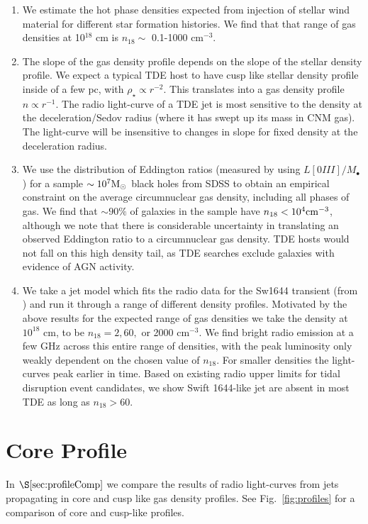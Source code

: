 \documentclass[usenatbib,fleqn]{mnras}
\newcommand{\Mbh}[1][]{M_{\bullet#1}}
\newcommand{\Msun}{{\rm M_\odot}}
\begin{document}
\begin{enumerate}
\item We estimate the hot phase densities expected from injection of
  stellar wind material for different star formation histories. We
  find that that range of gas densities at 10$^{18}$ cm is $n_{18}
  \sim$ 0.1-1000 cm$^{-3}$.

\item The slope of the gas density profile depends on the slope of the
  stellar density profile. We expect a typical TDE host to have cusp
  like stellar density profile inside of a few pc, with $\rho_\star
  \propto r^{-2}$. This translates into a gas density profile $n
  \propto r^{-1}$. The radio light-curve of a TDE jet is most
  sensitive to the density at the deceleration/Sedov radius (where it
  has swept up its mass in CNM gas). The light-curve will be
  insensitive to changes in slope for fixed density at the
  deceleration radius.

\item We use the distribution of Eddington ratios (measured by
  \citealt{Kauffmann+2009} using $L[0III]/\Mbh$) for a sample $\sim
  10^{7} \Msun$ black holes from SDSS to obtain an empirical
  constraint on the average circumnuclear gas density, including all
  phases of gas. We find that $\sim90\%$ of galaxies in the sample
  have $n_{18}<10^{4} {\rm cm}^{-3}$, although we note that there is
  considerable uncertainty in translating an observed Eddington ratio
  to a circumnuclear gas density. TDE hosts would not fall on this
  high density tail, as TDE searches exclude galaxies with evidence of
  AGN activity.

\item We take a jet model which fits the radio data for the Sw1644
  transient (from \citealt{Mimica+2015}) and run it through a range of
  different density profiles. Motivated by the above results for the
  expected range of gas densities we take the density at $10^{18}$ cm,
  to be $n_{18}=2, 60,$ or 2000 cm$^{-3}$. We find bright radio
  emission at a few GHz across this entire range of densities, with
  the peak luminosity only weakly dependent on the chosen value of
  $n_{18}$.  For smaller densities the light-curves peak earlier in
  time. Based on existing radio upper limits for tidal disruption
  event candidates, we show Swift 1644-like jet are absent in most TDE
  as long as $n_{18} > 60$.
\end{enumerate}

\appendix
\section{Core Profile}
\label{app:core}
In $\S\ref{sec:profileComp}$ we compare the results of radio
light-curves from jets propagating in core and cusp like gas density
profiles. See Fig.~\ref{fig:profiles} for a comparison of core and
cusp-like profiles. 
\end{document}
